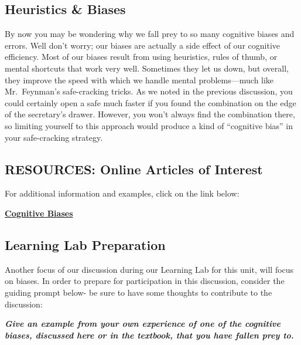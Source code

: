 \documentclass[
]{book}
\begin{document}
\hypertarget{heuristics-biases}{%
\subsection*{Heuristics \& Biases}\label{heuristics-biases}}

By now you may be wondering why we fall prey to so many cognitive biases and errors. Well don't worry; our biases are actually a side effect of our cognitive efficiency. Most of our biases result from using heuristics, rules of thumb, or mental shortcuts that work very well. Sometimes they let us down, but overall, they improve the speed with which we handle mental problems---much like Mr.~Feynman's safe-cracking tricks. As we noted in the previous discussion, you could certainly open a safe much faster if you found the combination on the edge of the secretary's drawer. However, you won't always find the combination there, so limiting yourself to this approach would produce a kind of ``cognitive bias'' in your safe-cracking strategy.

\hypertarget{resources-online-articles-of-interest}{%
\subsection*{RESOURCES: Online Articles of Interest}\label{resources-online-articles-of-interest}}

For additional information and examples, click on the link below:

\href{https://en.wikipedia.org/wiki/List_of_cognitive_biases}{\textbf{Cognitive Biases}}

\begin{reflect}
\hypertarget{learning-lab-preparation-1}{%
\subsection*{Learning Lab Preparation}\label{learning-lab-preparation-1}}

Another focus of our discussion during our Learning Lab for this unit, will focus on biases. In order to prepare for participation in this discussion, consider the guiding prompt below- be sure to have some thoughts to contribute to the discussion:

\textbf{\emph{Give an example from your own experience of one of the cognitive biases, discussed here or in the textbook, that you have fallen prey to.}}
\end{reflect}
\end{document}
